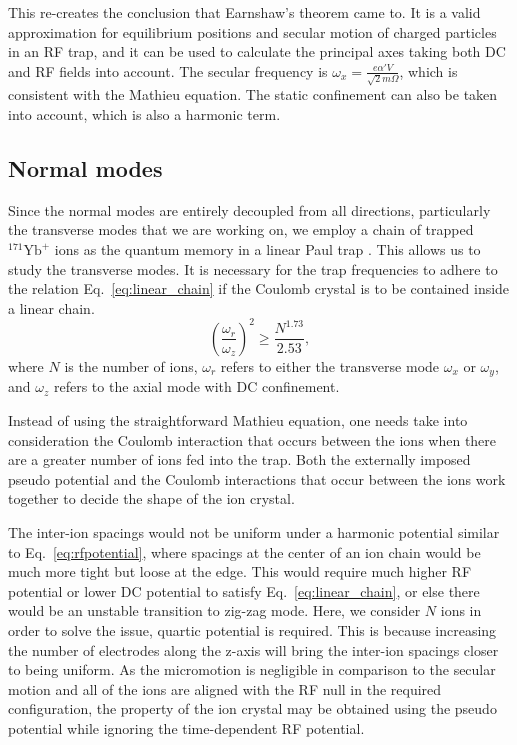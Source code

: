 This re-creates the conclusion that Earnshaw's theorem came to. It is a valid approximation for equilibrium positions and secular motion of charged particles in an RF trap, and it can be used to calculate the principal axes taking both DC and RF fields into account. The secular frequency is \(\omega_x=\frac{e\alpha' V}{\sqrt{2}m\Omega}\), which is consistent with the Mathieu equation. The static confinement can also be taken into account, which is also a harmonic term.

\subsection{Normal modes}

Since the normal modes are entirely decoupled from all directions, particularly the transverse modes that we are working on, we employ a chain of trapped ${ }^{171} \mathrm{Yb}^{+}$ ions as the quantum memory in a linear Paul trap \cite{RN57,RN27,RN55,RN60,RN110,RN56}. This allows us to study the transverse modes. It is necessary for the trap frequencies to adhere to the relation Eq.~\eqref{eq:linear_chain} if the Coulomb crystal is to be contained inside a linear chain.
\begin{equation}\label{eq:linear_chain}
    \left(\frac{\omega_r}{\omega_z}\right)^2 \geq \frac{N^{1.73}}{2.53},
\end{equation}
where \(N\) is the number of ions, \(\omega_r\) refers to either the transverse mode \(\omega_x\) or \(\omega_y\), and \(\omega_z\) refers to the axial mode with DC confinement.

Instead of using the straightforward Mathieu equation, one needs take into consideration the Coulomb interaction that occurs between the ions when there are a greater number of ions fed into the trap. Both the externally imposed pseudo potential and the Coulomb interactions that occur between the ions work together to decide the shape of the ion crystal.

The inter-ion spacings would not be uniform under a harmonic potential similar to Eq.~\eqref{eq:rfpotential}, where spacings at the center of an ion chain would be much more tight but loose at the edge. This would require much higher RF potential or lower DC potential to satisfy Eq.~\eqref{eq:linear_chain}, or else there would be an unstable transition to zig-zag mode. Here, we consider \(N\) ions in order to solve the issue, quartic potential is required. This is because increasing the number of electrodes along the z-axis will bring the inter-ion spacings closer to being uniform. As the micromotion is negligible in comparison to the secular motion and all of the ions are aligned with the RF null in the required configuration, the property of the ion crystal may be obtained using the pseudo potential while ignoring the time-dependent RF potential.

